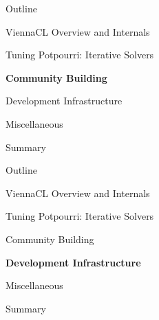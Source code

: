 %
%



%
%



%
%

\begin{frame}{Outline}
 \begin{block}{ViennaCL Overview and Internals}\end{block}
 \begin{block}{Tuning Potpourri: Iterative Solvers}\end{block}
 \begin{block}{\textbf{Community Building}}\end{block}
 \begin{block}{Development Infrastructure}\end{block}
 \begin{block}{Miscellaneous}\end{block}
 \begin{block}{Summary}\end{block}
\end{frame}




%
%

\begin{frame}{Outline}
 \begin{block}{ViennaCL Overview and Internals}\end{block}
 \begin{block}{Tuning Potpourri: Iterative Solvers}\end{block}
 \begin{block}{Community Building}\end{block}
 \begin{block}{\textbf{Development Infrastructure}}\end{block}
 \begin{block}{Miscellaneous}\end{block}
 \begin{block}{Summary}\end{block}
\end{frame}





%
%

